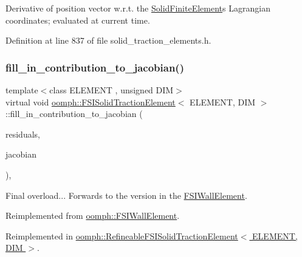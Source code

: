 Derivative of position vector w.\+r.\+t. the \hyperlink{classoomph_1_1SolidFiniteElement}{Solid\+Finite\+Element}\textquotesingle{}s Lagrangian coordinates; evaluated at current time. 



Definition at line 837 of file solid\+\_\+traction\+\_\+elements.\+h.

\mbox{\label{classoomph_1_1FSISolidTractionElement_a789bdb99ca30e3c7b56adab5be79a59d}} 
\subsubsection{\texorpdfstring{fill\+\_\+in\+\_\+contribution\+\_\+to\+\_\+jacobian()}{fill\_in\_contribution\_to\_jacobian()}}
{\footnotesize\ttfamily template$<$class E\+L\+E\+M\+E\+NT , unsigned D\+IM$>$ \\
virtual void \hyperlink{classoomph_1_1FSISolidTractionElement}{oomph\+::\+F\+S\+I\+Solid\+Traction\+Element}$<$ E\+L\+E\+M\+E\+NT, D\+IM $>$\+::fill\+\_\+in\+\_\+contribution\+\_\+to\+\_\+jacobian (\begin{DoxyParamCaption}\item[{\hyperlink{classoomph_1_1Vector}{Vector}$<$ double $>$ \&}]{residuals,  }\item[{\hyperlink{classoomph_1_1DenseMatrix}{Dense\+Matrix}$<$ double $>$ \&}]{jacobian }\end{DoxyParamCaption})\hspace{0.3cm}{\ttfamily [inline]}, {\ttfamily [virtual]}}



Final overload... Forwards to the version in the \hyperlink{classoomph_1_1FSIWallElement}{F\+S\+I\+Wall\+Element}. 



Reimplemented from \hyperlink{classoomph_1_1FSIWallElement_a7817d2662c24540d3757cb1a1194a635}{oomph\+::\+F\+S\+I\+Wall\+Element}.



Reimplemented in \hyperlink{classoomph_1_1RefineableFSISolidTractionElement_a886a6bcb5722c9535f6f78ccefdc0646}{oomph\+::\+Refineable\+F\+S\+I\+Solid\+Traction\+Element$<$ E\+L\+E\+M\+E\+N\+T, D\+I\+M $>$}.



